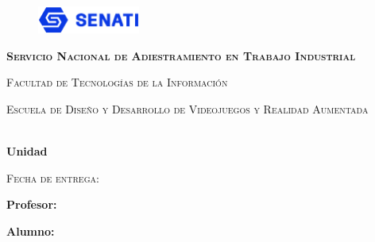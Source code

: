 \thispagestyle{empty}
\begin{figure}[ht]
	\includegraphics[width=0.3\textwidth]{img/senati.png}
	\endminipage
	\minipage{\textwidth}
	\endminipage
\end{figure}

\vspace{0.1cm}

\begin{center}
{\scshape\LARGE \textbf{Servicio Nacional de Adiestramiento en Trabajo Industrial} \par}
{\scshape\Large Facultad de Tecnologías de la Información \par}
{\scshape\large Escuela de Diseño y Desarrollo de Videojuegos y Realidad Aumentada \par}
\vspace{0.75cm}
{\Large \textbf{\myMateria}}
\end{center}

\begin{center}


	\vspace{0.75cm}

	{\LARGE\bfseries \MyReport\\Unidad \myUnidad\par}
	\vspace{0.75cm}

	{\scshape\Large Fecha de entrega: \myDate\par}
	\vspace{0.75cm}
	\LARGE	{ \textbf{Profesor:}}\\
	\large		{ \myTeacher}

	\vspace{0.5cm}

	\LARGE	{ \textbf{Alumno:}}

	\normalsize	 {\myName}

	\vspace{1.25cm}
	\vspace{0.9cm}

\end{center}

